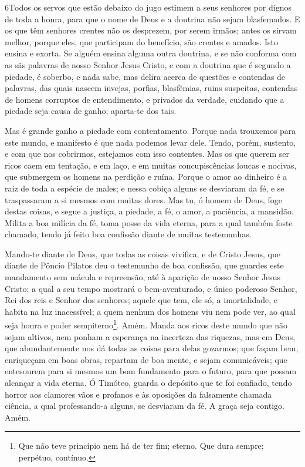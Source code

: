 \medskip

\lettrine{6} Todos os servos que estão debaixo do jugo estimem
a seus senhores por dignos de toda a honra, para que o nome de Deus
e a doutrina não sejam blasfemados. E os que têm senhores
crentes não os desprezem, por serem irmãos; antes os sirvam melhor,
porque eles, que participam do benefício, são crentes e amados. Isto
ensina e exorta. Se alguém ensina alguma outra doutrina, e se
não conforma com as sãs palavras de nosso Senhor Jesus Cristo, e com
a doutrina que é segundo a piedade, é soberbo, e nada sabe, mas
delira acerca de questões e contendas de palavras, das quais nascem
invejas, porfias, blasfêmias, ruins suspeitas, contendas de
homens corruptos de entendimento, e privados da verdade, cuidando
que a piedade seja causa de ganho; aparta-te dos tais.

Mas é grande ganho a piedade com contentamento. Porque nada
trouxemos para este mundo, e manifesto é que nada podemos levar
dele. Tendo, porém, sustento, e com que nos cobrirmos, estejamos
com isso contentes. Mas os que querem ser ricos caem em
tentação, e em laço, e em muitas concupiscências loucas e nocivas,
que submergem os homens na perdição e ruína. Porque o amor ao
dinheiro é a raiz de toda a espécie de males; e nessa cobiça alguns
se desviaram da fé, e se traspassaram a si mesmos com muitas dores.
Mas tu, ó homem de Deus, foge destas coisas, e segue a
justiça, a piedade, a fé, o amor, a paciência, a mansidão.
Milita a boa milícia da fé, toma posse da vida eterna, para a
qual também foste chamado, tendo já feito boa confissão diante de
muitas testemunhas.

Mando-te diante de Deus, que todas as coisas vivifica, e de
Cristo Jesus, que diante de Pôncio Pilatos deu o testemunho de boa
confissão, que guardes este mandamento sem mácula e
repreensão, até à aparição de nosso Senhor Jesus Cristo; a
qual a seu tempo mostrará o bem-aventurado, e único poderoso Senhor,
Rei dos reis e Senhor dos senhores; aquele que tem, ele só, a
imortalidade, e habita na luz inacessível; a quem nenhum dos homens
viu nem pode ver, ao qual seja honra e poder sempiterno\footnote{Que
não teve princípio nem há de ter fim; eterno. Que dura sempre;
perpétuo, contínuo.}. Amém. Manda aos ricos deste mundo que
não sejam altivos, nem ponham a esperança na incerteza das riquezas,
mas em Deus, que abundantemente nos dá todas as coisas para delas
gozarmos; que façam bem, enriqueçam em boas obras, repartam
de boa mente, e sejam comunicáveis; que entesourem para si
mesmos um bom fundamento para o futuro, para que possam alcançar a
vida eterna. Ó Timóteo, guarda o depósito que te foi
confiado, tendo horror aos clamores vãos e profanos e às oposições
da falsamente chamada ciência, a qual professando-a alguns,
se desviaram da fé. A graça seja contigo. Amém.

